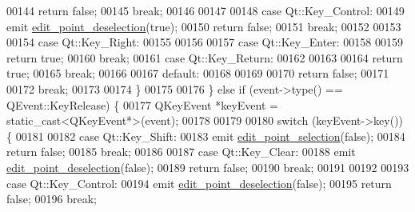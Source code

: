 \begin{DoxyCode}
00144                     \textcolor{keywordflow}{return} \textcolor{keyword}{false};
00145                      \textcolor{keywordflow}{break};
00146 
00147 
00148             \textcolor{keywordflow}{case} Qt::Key\_Control:
00149                     emit \hyperlink{a00004_a2b9629d20c2b97c01bf8486c89fd0148}{edit\_point\_deselection}(\textcolor{keyword}{true});
00150                     \textcolor{keywordflow}{return} \textcolor{keyword}{false};
00151                  \textcolor{keywordflow}{break};
00152 
00153 
00154             \textcolor{keywordflow}{case} Qt::Key\_Right:
00155 
00156 
00157             \textcolor{keywordflow}{case} Qt::Key\_Enter:
00158 
00159                  \textcolor{keywordflow}{return} \textcolor{keyword}{true};
00160                 \textcolor{keywordflow}{break};
00161             \textcolor{keywordflow}{case} Qt::Key\_Return:
00162 
00163 
00164                  \textcolor{keywordflow}{return} \textcolor{keyword}{true};
00165                 \textcolor{keywordflow}{break};
00166 
00167             \textcolor{keywordflow}{default}:
00168 
00169 
00170                 \textcolor{keywordflow}{return} \textcolor{keyword}{false};
00171 
00172                \textcolor{keywordflow}{break};
00173 
00174             \}
00175 
00176         \} \textcolor{keywordflow}{else}  \textcolor{keywordflow}{if} (event->type() == QEvent::KeyRelease) \{
00177             QKeyEvent *keyEvent = \textcolor{keyword}{static\_cast<}QKeyEvent*\textcolor{keyword}{>}(event);
00178 
00179 
00180             \textcolor{keywordflow}{switch} (keyEvent->key()) \{
00181 
00182             \textcolor{keywordflow}{case} Qt::Key\_Shift:
00183                    emit \hyperlink{a00004_a9aa2af0c329358fd96f7fb6b7f02bfe1}{edit\_point\_selection}(\textcolor{keyword}{false});
00184                   \textcolor{keywordflow}{return} \textcolor{keyword}{false};
00185                  \textcolor{keywordflow}{break};
00186 
00187             \textcolor{keywordflow}{case} Qt::Key\_Clear:
00188                     emit \hyperlink{a00004_a2b9629d20c2b97c01bf8486c89fd0148}{edit\_point\_deselection}(\textcolor{keyword}{false});
00189                     \textcolor{keywordflow}{return} \textcolor{keyword}{false};
00190                      \textcolor{keywordflow}{break};
00191 
00192 
00193             \textcolor{keywordflow}{case} Qt::Key\_Control:
00194                     emit \hyperlink{a00004_a2b9629d20c2b97c01bf8486c89fd0148}{edit\_point\_deselection}(\textcolor{keyword}{false});
00195                     \textcolor{keywordflow}{return} \textcolor{keyword}{false};
00196                      \textcolor{keywordflow}{break};

\end{DoxyCode}
